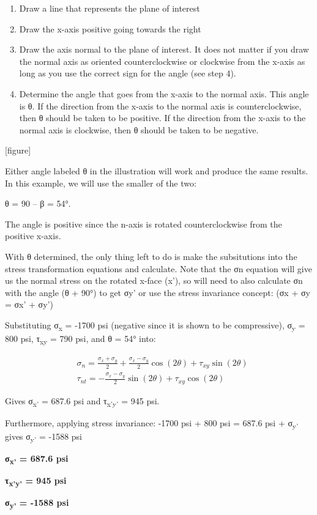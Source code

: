 \documentclass[
  letterpaper,
  DIV=11,
  numbers=noendperiod]{scrreprt}
\begin{document}
\begin{tcolorbox}
\begin{tcolorbox}
\begin{enumerate}
\def\labelenumi{\arabic{enumi}.}
\item
  Draw a line that represents the plane of interest
\item
  Draw the x-axis positive going towards the right
\item
  Draw the axis normal to the plane of interest. It does not matter if
  you draw the normal axis as oriented counterclockwise or clockwise
  from the x-axis as long as you use the correct sign for the angle (see
  step 4).
\item
  Determine the angle that goes from the x-axis to the normal axis. This
  angle is θ. If the direction from the x-axis to the normal axis is
  counterclockwise, then θ should be taken to be positive. If the
  direction from the x-axis to the normal axis is clockwise, then θ
  should be taken to be negative.
\end{enumerate}

{[}figure{]}

Either angle labeled θ in the illustration will work and produce the
same results. In this example, we will use the smaller of the two:

θ = 90 -- β = 54°.

The angle is positive since the n-axis is rotated counterclockwise from
the positive x-axis.

With θ determined, the only thing left to do is make the subsitutions
into the stress transformation equations and calculate. Note that the σn
equation will give us the normal stress on the rotated x-face (x'), so
will need to also calculate σn with the angle (θ + 90°) to get σy' or
use the stress invariance concept: (σx + σy = σx' + σy')

Substituting σ\textsubscript{x} = -1700 psi (negative since it is shown
to be compressive), σ\textsubscript{y} = 800 psi, τ\textsubscript{xy} =
790 psi, and θ = 54° into:

\[
\begin{aligned}
& \sigma_n=\frac{\sigma_x+\sigma_y}{2}+\frac{\sigma_x-\sigma_y}{2} \cos (2 \theta)+\tau_{x y} \sin (2 \theta) \\
& \tau_{n t}=-\frac{\sigma_x-\sigma_y}{2} \sin (2 \theta)+\tau_{x y} \cos (2 \theta)
\end{aligned}
\]

Gives σ\textsubscript{x'} = 687.6 psi and τ\textsubscript{x'y'} = 945
psi.

Furthermore, applying stress invariance: -1700 psi + 800 psi = 687.6 psi
+ σ\textsubscript{y'} gives σ\textsubscript{y'} = -1588 psi

\textbf{σ\textsubscript{x'} = 687.6 psi}

\textbf{τ\textsubscript{x'y'} = 945 psi}

\textbf{σ\textsubscript{y'} = -1588 psi}

\end{tcolorbox}

\end{tcolorbox}
\end{document}
